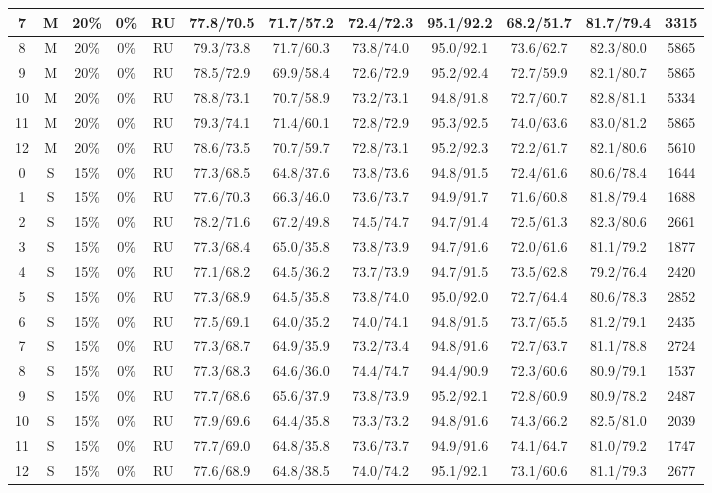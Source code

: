 \begin{table*}
{\begin{tabular}{|c|c|c|c|c||c|c|c|c|c|c||c|}
7 & M & 20\% & 0\% & RU & 77.8/70.5 & 71.7/57.2 & 72.4/72.3 & 95.1/92.2 & 68.2/51.7 & 81.7/79.4 & 3315 \\ \hline
8 & M & 20\% & 0\% & RU & 79.3/73.8 & 71.7/60.3 & 73.8/74.0 & 95.0/92.1 & 73.6/62.7 & 82.3/80.0 & 5865 \\ \hline
9 & M & 20\% & 0\% & RU & 78.5/72.9 & 69.9/58.4 & 72.6/72.9 & 95.2/92.4 & 72.7/59.9 & 82.1/80.7 & 5865 \\ \hline
10 & M & 20\% & 0\% & RU & 78.8/73.1 & 70.7/58.9 & 73.2/73.1 & 94.8/91.8 & 72.7/60.7 & 82.8/81.1 & 5334 \\ \hline
11 & M & 20\% & 0\% & RU & 79.3/74.1 & 71.4/60.1 & 72.8/72.9 & 95.3/92.5 & 74.0/63.6 & 83.0/81.2 & 5865 \\ \hline
12 & M & 20\% & 0\% & RU & 78.6/73.5 & 70.7/59.7 & 72.8/73.1 & 95.2/92.3 & 72.2/61.7 & 82.1/80.6 & 5610 \\ \hline
0 & S & 15\% & 0\% & RU & 77.3/68.5 & 64.8/37.6 & 73.8/73.6 & 94.8/91.5 & 72.4/61.6 & 80.6/78.4 & 1644 \\ \hline
1 & S & 15\% & 0\% & RU & 77.6/70.3 & 66.3/46.0 & 73.6/73.7 & 94.9/91.7 & 71.6/60.8 & 81.8/79.4 & 1688 \\ \hline
2 & S & 15\% & 0\% & RU & 78.2/71.6 & 67.2/49.8 & 74.5/74.7 & 94.7/91.4 & 72.5/61.3 & 82.3/80.6 & 2661 \\ \hline
3 & S & 15\% & 0\% & RU & 77.3/68.4 & 65.0/35.8 & 73.8/73.9 & 94.7/91.6 & 72.0/61.6 & 81.1/79.2 & 1877 \\ \hline
4 & S & 15\% & 0\% & RU & 77.1/68.2 & 64.5/36.2 & 73.7/73.9 & 94.7/91.5 & 73.5/62.8 & 79.2/76.4 & 2420 \\ \hline
5 & S & 15\% & 0\% & RU & 77.3/68.9 & 64.5/35.8 & 73.8/74.0 & 95.0/92.0 & 72.7/64.4 & 80.6/78.3 & 2852 \\ \hline
6 & S & 15\% & 0\% & RU & 77.5/69.1 & 64.0/35.2 & 74.0/74.1 & 94.8/91.5 & 73.7/65.5 & 81.2/79.1 & 2435 \\ \hline
7 & S & 15\% & 0\% & RU & 77.3/68.7 & 64.9/35.9 & 73.2/73.4 & 94.8/91.6 & 72.7/63.7 & 81.1/78.8 & 2724 \\ \hline
8 & S & 15\% & 0\% & RU & 77.3/68.3 & 64.6/36.0 & 74.4/74.7 & 94.4/90.9 & 72.3/60.6 & 80.9/79.1 & 1537 \\ \hline
9 & S & 15\% & 0\% & RU & 77.7/68.6 & 65.6/37.9 & 73.8/73.9 & 95.2/92.1 & 72.8/60.9 & 80.9/78.2 & 2487 \\ \hline
10 & S & 15\% & 0\% & RU & 77.9/69.6 & 64.4/35.8 & 73.3/73.2 & 94.8/91.6 & 74.3/66.2 & 82.5/81.0 & 2039 \\ \hline
11 & S & 15\% & 0\% & RU & 77.7/69.0 & 64.8/35.8 & 73.6/73.7 & 94.9/91.6 & 74.1/64.7 & 81.0/79.2 & 1747 \\ \hline
12 & S & 15\% & 0\% & RU & 77.6/68.9 & 64.8/38.5 & 74.0/74.2 & 95.1/92.1 & 73.1/60.6 & 81.1/79.3 & 2677 \\ \hline
\end{tabular}}
\end{table*}

